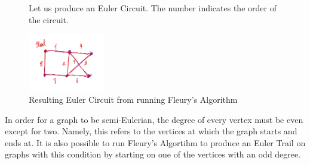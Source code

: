 \begin{figure}[ht]
\begin{nexample}
  Let us produce an Euler Circuit. The number indicates the order of the
  circuit.

  \centering
  \includegraphics[width=0.3\textwidth]{figures/l02/fleury-example}
  \caption{Resulting Euler Circuit from running Fleury's Algorithm}
\end{nexample}
\end{figure}

\begin{remark}
  In order for a graph to be semi-Eulerian, the degree of every vertex must be
  even except for two. Namely, this refers to the vertices at which the graph
  starts and ends at. It is also possible to run Fleury's Algortihm to produce
  an Euler Trail on graphs with this condition by starting on one of the
  vertices with an odd degree.
\end{remark}
